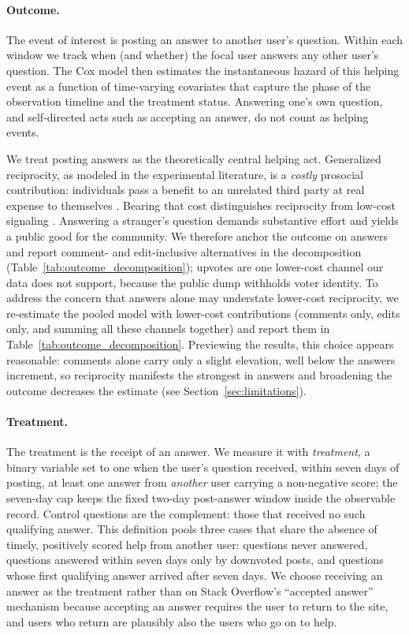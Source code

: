 \paragraph{Outcome.} The event of interest is posting an answer to another user's question. Within each window we track when (and whether) the focal user answers any other user's question. The Cox model then estimates the instantaneous hazard of this helping event as a function of time-varying covariates that capture the phase of the observation timeline and the treatment status. Answering one's own question, and self-directed acts such as accepting an answer, do not count as helping events.

We treat posting answers as the theoretically central helping act. Generalized reciprocity, as modeled in the experimental literature, is a \emph{costly} prosocial contribution: individuals pass a benefit to an unrelated third party at real expense to themselves \citep{greiner_indirect_2005, stanca_measuring_2009, mujcic_indirect_2018}. Bearing that cost distinguishes reciprocity from low-cost signaling \citep{molm_building_2007}. Answering a stranger's question demands substantive effort and yields a public good for the community. We therefore anchor the outcome on answers and report comment- and edit-inclusive alternatives in the decomposition (Table~\ref{tab:outcome_decomposition}); upvotes are one lower-cost channel our data does not support, because the public dump withholds voter identity. To address the concern that answers alone may understate lower-cost reciprocity, we re-estimate the pooled model with lower-cost contributions (comments only, edits only, and summing all these channels together) and report them in Table~\ref{tab:outcome_decomposition}. Previewing the results, this choice appears reasonable: comments alone carry only a slight elevation, well below the answers increment, so reciprocity manifests the strongest in answers and broadening the outcome decreases the estimate (see Section~\ref{sec:limitations}).

\paragraph{Treatment.} The treatment is the receipt of an answer. We measure it with \textit{treatment}, a binary variable set to one when the user's question received, within seven days of posting, at least one answer from \emph{another} user carrying a non-negative score; the seven-day cap keeps the fixed two-day post-answer window inside the observable record. Control questions are the complement: those that received no such qualifying answer. This definition pools three cases that share the absence of timely, positively scored help from another user: questions never answered, questions answered within seven days only by downvoted posts, and questions whose first qualifying answer arrived after seven days. We choose receiving an answer as the treatment rather than on Stack Overflow's ``accepted answer'' mechanism because accepting an answer requires the user to return to the site, and users who return are plausibly also the users who go on to help.

